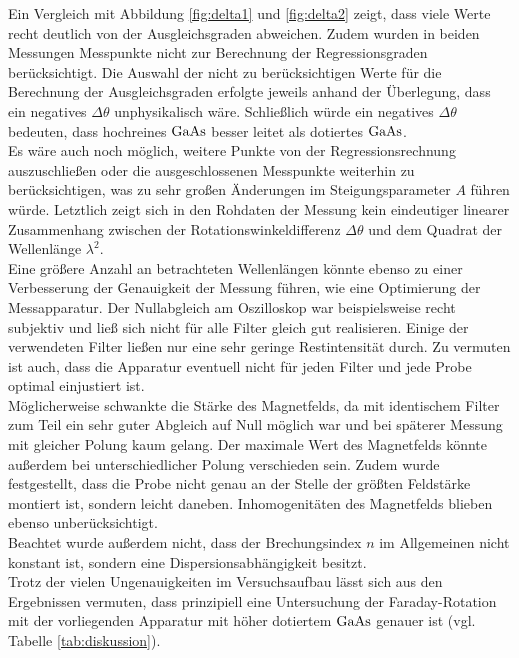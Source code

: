 Ein Vergleich mit Abbildung \ref{fig:delta1} und \ref{fig:delta2} zeigt, dass viele Werte recht deutlich von der Ausgleichsgraden abweichen. Zudem wurden in beiden Messungen Messpunkte nicht zur Berechnung der Regressionsgraden berücksichtigt. Die Auswahl der nicht zu berücksichtigen Werte für die Berechnung der Ausgleichsgraden erfolgte jeweils anhand der Überlegung, dass ein negatives $\Delta\theta$ unphysikalisch wäre. Schließlich würde ein negatives $\Delta\theta$ bedeuten, dass hochreines $\ce{GaAs}$ besser leitet als dotiertes $\ce{GaAs}$.\\
Es wäre auch noch möglich, weitere Punkte von der Regressionsrechnung auszuschließen oder die ausgeschlossenen Messpunkte weiterhin zu berücksichtigen, was zu sehr großen Änderungen im Steigungsparameter $A$ führen würde.
Letztlich zeigt sich in den Rohdaten der Messung kein eindeutiger linearer Zusammenhang zwischen der Rotationswinkeldifferenz $\Delta\theta$ und dem Quadrat der Wellenlänge $\lambda^{2}$.\\
Eine größere Anzahl an betrachteten Wellenlängen könnte ebenso zu einer Verbesserung der Genauigkeit der Messung führen, wie eine Optimierung der Messapparatur.
Der Nullabgleich am Oszilloskop war beispielsweise recht subjektiv und ließ sich nicht für alle Filter gleich gut realisieren.
Einige der verwendeten Filter ließen nur eine sehr geringe Restintensität durch.
Zu vermuten ist auch, dass die Apparatur eventuell nicht für jeden Filter und jede Probe optimal einjustiert ist.\\
Möglicherweise schwankte die Stärke des Magnetfelds, da mit identischem Filter zum Teil ein sehr guter Abgleich auf Null möglich war und bei späterer Messung mit gleicher Polung kaum gelang. Der maximale Wert des Magnetfelds könnte außerdem bei unterschiedlicher Polung verschieden sein. Zudem wurde festgestellt, dass die Probe nicht genau an der Stelle der größten Feldstärke montiert ist, sondern leicht daneben. Inhomogenitäten des Magnetfelds blieben ebenso unberücksichtigt.\\
Beachtet wurde außerdem nicht, dass der Brechungsindex $n$ im Allgemeinen nicht konstant ist, sondern eine Dispersionsabhängigkeit besitzt.\\

Trotz der vielen Ungenauigkeiten im Versuchsaufbau lässt sich aus den Ergebnissen vermuten, dass prinzipiell eine Untersuchung der Faraday-Rotation mit der vorliegenden Apparatur mit höher dotiertem $\ce{GaAs}$ genauer ist (vgl. Tabelle \ref{tab:diskussion}).
